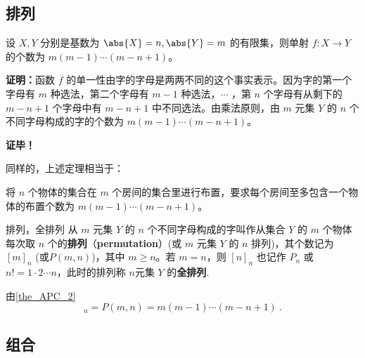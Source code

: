 \subsection{排列}
\begin{theorem}{}
设 $X,Y$ 分别是基数为 $\abs{X}=n,\abs{Y}=m$ 的有限集，则单射 $f:X\rightarrow Y$ 的个数为 $m(m-1)\cdots(m-n+1)$。
\end{theorem}
\textbf{证明：}函数 $f$ 的单一性由字的字母是两两不同的这个事实表示。因为字的第一个字母有 $m$ 种选法，第二个字母有 $m-1$ 种选法，$\cdots$ ，第 $n$ 个字母有从剩下的 $m-n+1$ 个字母中有 $m-n+1$ 中不同选法。由乘法原则，由 $m$ 元集 $Y$ 的 $n$ 个不同字母构成的字的个数为 $m(m-1)\cdots(m-n+1)$。

\textbf{证毕！}

同样的，上述定理相当于：
\begin{theorem}{}\label{the_APC_2}
将 $n$ 个物体的集合在 $m$ 个房间的集合里进行布置，要求每个房间至多包含一个物体的布置个数为 $m(m-1)\cdots(m-n+1)$。
\end{theorem}

\begin{definition}{排列，全排列}\label{def_APC_3}
从 $m$ 元集 $Y$ 的 $n$ 个不同字母构成的字叫作从集合 $Y$ 的 $m$ 个物体每次取 $n$ 个的\textbf{排列}（\textbf{permutation}）(或 $m$ 元集 $Y$ 的 $n$ 排列)，其个数记为 $[m]_n$ (或$P(m,n)$)，其中 $m\geq n$。若 $m=n$，则 $[n]_n$ 也记作 $P_n$ 或 $n!=1\cdot2\cdots n$，此时的排列称 $n$元集 $Y$ 的\textbf{全排列}.
\end{definition}
由\autoref{the_APC_2} 
\begin{equation}
[m]_n=P(m,n)=m(m-1)\cdots(m-n+1)~.
\end{equation}


\subsection{组合}

